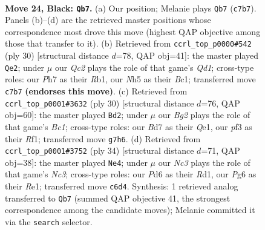 \documentclass[11pt]{article}
\begin{document}
\clearpage

\begin{figure}[p]\centering
\begin{subfigure}{0.46\textwidth}\centering
\resizebox{\linewidth}{!}{%
\newchessgame
\chessboard[
  setfen={r6r/2qb1kbp/p1npp1p1/1p2p1Pn/4P2P/2N2P2/PPPK1BQ1/RR3B2 b - - 0 24},
  showmover=false,
  pgfstyle=straightmove, color=movearrow, markmove={c7-b7}
]}
\caption{}
\end{subfigure}\hfill
\begin{subfigure}{0.46\textwidth}\centering
\resizebox{\linewidth}{!}{%
\newchessgame
\chessboard[
  setfen={r1q2rk1/pp1bppbp/6p1/2p2n2/4N3/P1PP2PP/1P3PBK/1RBQ1R2 w - - 1 16},
  showmover=false,
  pgfstyle=straightmove, color=movearrow, markmove={d1-e2}
]}
\caption{}
\end{subfigure}
\\[4pt]
\begin{subfigure}{0.46\textwidth}\centering
\resizebox{\linewidth}{!}{%
\newchessgame
\chessboard[
  setfen={1r1q1rk1/3bppb1/3p1npp/1p6/3pPPP1/3P3P/1PP3B1/R1BNQRK1 w - - 0 16},
  showmover=false,
  pgfstyle=straightmove, color=movearrow, markmove={c1-d2}
]}
\caption{}
\end{subfigure}\hfill
\begin{subfigure}{0.46\textwidth}\centering
\resizebox{\linewidth}{!}{%
\newchessgame
\chessboard[
  setfen={r2qr1k1/1ppbnpb1/p2p2pp/4p1n1/1PP5/P1NPP2P/2Q2PPN/B2RRBK1 w - - 1 18},
  showmover=false,
  pgfstyle=straightmove, color=movearrow, markmove={c3-e4}
]}
\caption{}
\end{subfigure}
\caption{\textbf{Move 24, Black: \texttt{Qb7}.} (a) Our position; Melanie plays \texttt{Qb7} (\texttt{c7b7}). Panels (b)--(d) are the retrieved master positions whose correspondence most drove this move (highest QAP objective among those that transfer to it). (b) Retrieved from \texttt{ccrl\_top\_p0000\#542} (ply 30) [structural distance $d$=78, QAP obj=41]: the master played \texttt{Qe2}; under $\mu$ our \emph{Qc2} plays the role of that game's \emph{Qd1}; cross-type roles: our \emph{P}h7 as their \emph{R}b1, our \emph{N}h5 as their \emph{B}c1; transferred move \texttt{c7b7} \textbf{(endorses this move)}. (c) Retrieved from \texttt{ccrl\_top\_p0001\#3632} (ply 30) [structural distance $d$=76, QAP obj=60]: the master played \texttt{Bd2}; under $\mu$ our \emph{Bg2} plays the role of that game's \emph{Bc1}; cross-type roles: our \emph{B}d7 as their \emph{Q}e1, our \emph{p}f3 as their \emph{R}f1; transferred move \texttt{g7h6}. (d) Retrieved from \texttt{ccrl\_top\_p0001\#3752} (ply 34) [structural distance $d$=71, QAP obj=38]: the master played \texttt{Ne4}; under $\mu$ our \emph{Nc3} plays the role of that game's \emph{Nc3}; cross-type roles: our \emph{P}d6 as their \emph{R}d1, our \emph{P}g6 as their \emph{R}e1; transferred move \texttt{c6d4}. Synthesis: 1 retrieved analog transferred to \texttt{Qb7} (summed QAP objective 41, the strongest correspondence among the candidate moves); Melanie committed it via the \texttt{search} selector.}
\label{fig:thought-m47}
\end{figure}
\end{document}
